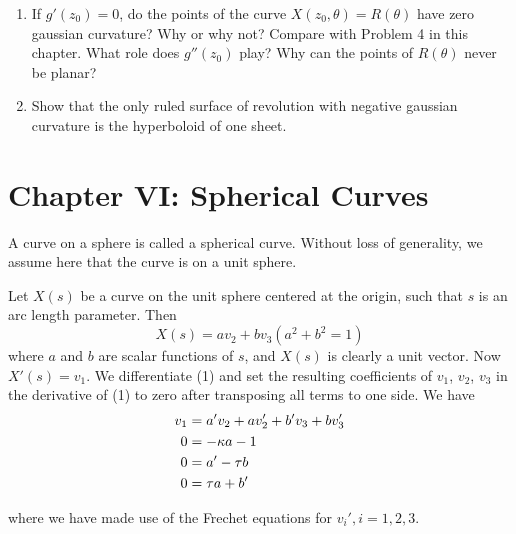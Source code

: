 \documentclass{book}
\begin{document}
\begin{enumerate}[1.]
    Assume that $r = g(z)$ is a single valued $C^{2}$ function, and represent the surface of revolution by
    \begin{equation}
      X(z,\theta ) = ( g(z) \cos \theta, g(z) \sin \theta , z)
    \end{equation}
    Repeat the analysis of this chapter using (5).
  \item If $g'(z_{0}) = 0$, do the points of the curve $X(z_{0},\theta) = R(\theta)$ have zero gaussian curvature? Why or why not? Compare with Problem 4 in this chapter. What role does $g''(z_{0})$ play? Why can the points of $R(\theta)$ never be planar?
  \item Show that the only ruled surface of revolution with negative gaussian curvature is the hyperboloid of one sheet.
\end{enumerate}



\chapter*{Chapter VI: Spherical Curves}

\setcounter{equation}{0}

A curve on a sphere is called a spherical curve. Without loss of generality, we assume here that the curve is on a unit sphere.

Let $X(s)$ be a curve on the unit sphere centered at the origin, such that $s$ is an arc length parameter. Then
\begin{equation}
X(s) = av_{2} + bv_{3} (a^{2} + b^{2} = 1)
\end{equation}
where $a$ and $b$ are scalar functions of $s$, and $X(s)$ is clearly a unit vector. Now $X'(s) = v_{1}$. We differentiate (1) and set the resulting coefficients of $v_{1}$, $v_{2}$, $v_{3}$ in the derivative of (1) to zero after transposing all terms to one side. We have
\begin{align}
v_{1} & = a'v_{2} + av'_{2} + b'v_{3} + bv'_{3} \\
    0 & = - \kappa a - 1 \notag \\
    0 & = a' - \tau b \notag \\
    0 & = \tau a + b' \notag
\end{align}

where we have made use of the Frechet equations for $v_{i}', i=1,2,3$.
\end{document}
